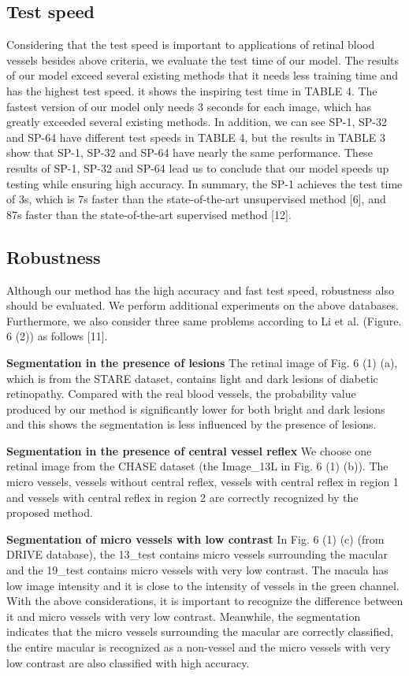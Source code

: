 \documentclass{article}
\begin{document}
\subsection{Test speed}
Considering that the test speed is important to applications of retinal blood vessels besides above criteria, we evaluate the test time of our model. The results of our model exceed several existing methods that it needs less training time and has the highest test speed. it shows the inspiring test time in TABLE 4. The fastest version of our model only needs 3 seconds for each image, which has greatly exceeded several existing methods. In addition, we can see SP-1, SP-32 and SP-64 have different test speeds in TABLE 4, but the results in TABLE 3 show that SP-1, SP-32 and SP-64 have nearly the same performance. These results of SP-1, SP-32 and SP-64 lead us to conclude that our model speeds up testing while ensuring high accuracy. In summary, the SP-1 achieves the test time of 3s, which is 7s faster than the state-of-the-art unsupervised method [6], and 87s faster than the state-of-the-art supervised method [12].

\subsection{Robustness}

Although our method has the high accuracy and fast test speed, robustness also should be evaluated. We perform additional experiments on the above databases. Furthermore, we also consider three same problems according to Li et al. (Figure. 6 (2)) as follows [11].

{\bfseries Segmentation in the presence of lesions} The retinal image of Fig. 6 (1) (a), which is from the STARE dataset, contains light and dark lesions of diabetic retinopathy. Compared with the real blood vessels, the probability value produced by our method is significantly lower for both bright and dark lesions and this shows the segmentation is less influenced by the presence of lesions. 

{\bfseries Segmentation in the presence of central vessel reflex} We choose one retinal image from the CHASE dataset (the Image\_13L in Fig. 6 (1) (b)). The micro vessels, vessels without central reflex, vessels with central reflex in region 1 and vessels with central reflex in region 2 are correctly recognized by the proposed method.

{\bfseries Segmentation of micro vessels with low contrast}	In Fig. 6 (1) (c) (from DRIVE database), the 13\_test contains micro vessels surrounding the macular and the 19\_test contains micro vessels with very low contrast. The macula has low image intensity and it is close to the intensity of vessels in the green channel. With the above considerations, it is important to recognize the difference between it and micro vessels with very low contrast. Meanwhile, the segmentation indicates that the micro vessels surrounding the macular are correctly classified, the entire macular is recognized as a non-vessel and the micro vessels with very low contrast are also classified with high accuracy.
\end{document}
